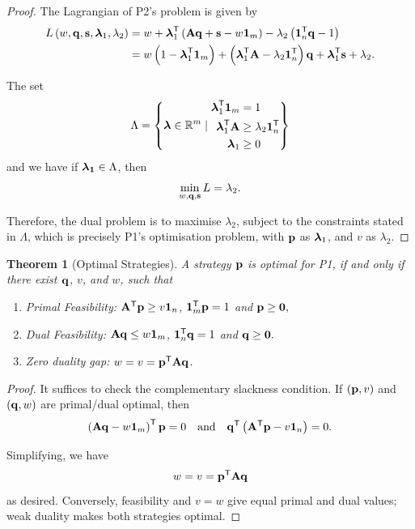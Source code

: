 \documentclass[11pt]{article}
\newtheorem{theorem}{Theorem}[section]
\theoremstyle{definition}
\theoremstyle{remark}
\newcommand{\pqty}[1]{\left(#1\right)}
\newcommand{\set}[2]{\left\{#1\mid #2\right\}}
\newcommand{\RR}{\mathbb{R}}
\newcommand{\transpose}{^{\mathsf{T}}}
\newcommand{\qand}{\quad\text{and}\quad}
\begin{document}
\begin{proof}
    The Lagrangian of P2's problem is given by
    \begin{align*}
        L\pqty{w, \vb{q}, \vb{s}, \vb*{\lambda}_1, \lambda_2} &= w + \vb*{\lambda}_1\transpose \pqty{\vb{Aq} + \vb{s} - w \vb{1}_m} - \lambda_2 \pqty{\vb{1}_n\transpose \vb{q} - 1} \\
        &= w \pqty{1 - \vb*{\lambda}_1\transpose \vb{1}_m} + \pqty{\vb*{\lambda}_1\transpose \vb{A} - \lambda_2 \vb{1}_n\transpose} \vb{q} + \vb*{\lambda}_1\transpose \vb{s} + \lambda_2.
    \end{align*}

    The set
    \[
        \Lambda = \set{\vb*{\lambda} \in \RR^m}{
            \begin{aligned}
                \vb*{\lambda}_1\transpose \vb{1}_m &= 1 \\
                \vb*{\lambda}_1\transpose \vb{A} &\geq \lambda_2 \vb{1}_n\transpose \\
                \vb*{\lambda}_1 &\geq 0
            \end{aligned}}
    \]
    and we have if \(\vb*{\lambda_1} \in \Lambda\), then
    \[
        \min_{w, \vb{q}, \vb{s}} L = \lambda_2.
    \]

    Therefore, the dual problem is to maximise \(\lambda_2\), subject to the constraints stated in \(\Lambda\), which is precisely P1's optimisation problem, with \(\vb{p}\) as \(\vb*{\lambda}_1\), and \(v\) as \(\lambda_2\).
\end{proof}

\begin{theorem}[Optimal Strategies]\label{optim-unit-0062}
    A strategy \(\vb{p}\) is optimal for P1, if and only if there exist \(\vb{q}\), \(v\), and \(w\), such that
    \begin{enumerate}
        \item Primal Feasibility: \(\vb{A}\transpose \vb{p} \geq v \vb{1}_n\), \(\vb{1}_m\transpose \vb{p} = 1\) and \(\vb{p} \geq \vb{0},\)
        \item Dual Feasibility: \(\vb{A} \vb{q} \leq w \vb{1}_m\), \(\vb{1}_n\transpose \vb{q} = 1\) and \(\vb{q} \geq \vb{0}.\)
        \item Zero duality gap: \(w=v=\vb{p}\transpose\vb{Aq}\).
    \end{enumerate}
\end{theorem}

\begin{proof}
    It suffices to check the complementary slackness condition. If \(\pqty{\vb{p}, v}\) and \(\pqty{\vb{q}, w}\) are primal/dual optimal, then
    \[
        \pqty{\vb{Aq} - w \vb{1}_m}\transpose \vb{p} = 0 \qand \vb{q}\transpose \pqty{\vb{A}\transpose \vb{p} - v \vb{1}_n} = 0.
    \]

    Simplifying, we have
    \[
        w = v = \vb{p}\transpose \vb{A} \vb{q}
    \]
    as desired. Conversely, feasibility and \(v=w\) give equal primal and dual
values; weak duality makes both strategies optimal.
\end{proof}
\end{document}

